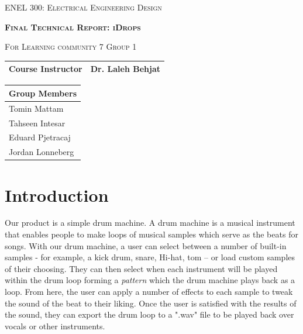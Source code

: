 \documentclass[11pt]{article}
\author{fbi}
\date{\today}
\title{}
\begin{document}
\begin{titlepage}
   \begin{center}
       \vspace*{1cm}


        {\textsc{\large ENEL 300: Electrical Engineering Design}}

        \vspace{0.5cm}

        \textsc{\textbf{\huge  Final Technical Report: iDrops}}
 
        \vspace{0.3cm}

        {\textsc{\large For Learning community 7 Group 1}}
 
       \vspace{1.5cm}
 
       \begin{tabular}{l r}
         \toprule
          \textbf{Course Instructor} & Dr. Laleh Behjat \\
         \bottomrule
       \end{tabular}
 
       \vfill
 
       \begin{tabular}{l}
       \textbf{Group Members} \\
       \midrule
       Tomin Mattam \\
       Tahseen Intesar \\
       Eduard Pjetracaj \\
       Jordan Lonneberg \\
       \bottomrule
       \end{tabular}
 
       \vspace{0.8cm}
 

   \end{center}
\end{titlepage}

\section{Introduction}
\label{sec:org0a35038}
Our product is a simple drum machine. A drum machine is a musical
instrument that enables people to make loops of musical samples which
serve as the beats for songs. With our drum machine, a user can select
between a number of built-in samples - for example, a kick drum,
snare, Hi-hat, tom -- or load custom samples of their choosing.  They
can then select when each instrument will be played within the drum
loop forming a \emph{pattern} which the drum machine plays back as a loop.
From here, the user can apply a number of effects to each sample to
tweak the sound of the beat to their liking. Once the user is
satisfied with the results of the sound, they can export the drum loop
to a ".wav" file to be played back over vocals or other instruments.
\end{document}
